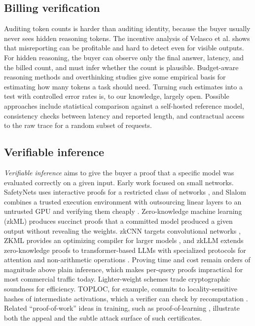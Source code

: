 \subsection{Billing verification}\label{billing-verification}

Auditing token counts is harder than auditing identity, because the buyer usually never sees hidden reasoning tokens. The incentive analysis of Velasco et al. \cite{velasco2025overcharging} shows that misreporting can be profitable and hard to detect even for visible outputs. For hidden reasoning, the buyer can observe only the final answer, latency, and the billed count, and must infer whether the count is plausible. Budget-aware reasoning methods \cite{han2024tokenbudget} and overthinking studies \cite{chen2024overthinking} give some empirical basis for estimating how many tokens a task should need. Turning such estimates into a test with controlled error rates is, to our knowledge, largely open. Possible approaches include statistical comparison against a self-hosted reference model, consistency checks between latency and reported length, and contractual access to the raw trace for a random subset of requests.

\subsection{Verifiable inference}\label{verifiable-inference}

\emph{Verifiable inference} aims to give the buyer a proof that a specific model was evaluated correctly on a given input. Early work focused on small networks. SafetyNets uses interactive proofs for a restricted class of networks \cite{ghodsi2017safetynets}, and Slalom combines a trusted execution environment with outsourcing linear layers to an untrusted GPU and verifying them cheaply \cite{tramer2019slalom}. Zero-knowledge machine learning (zkML) produces succinct proofs that a committed model produced a given output without revealing the weights. zkCNN targets convolutional networks \cite{liu2021zkcnn}, ZKML provides an optimizing compiler for larger models \cite{chen2024zkml}, and zkLLM extends zero-knowledge proofs to transformer-based LLMs with specialized protocols for attention and non-arithmetic operations \cite{sun2024zkllm}. Proving time and cost remain orders of magnitude above plain inference, which makes per-query proofs impractical for most commercial traffic today. Lighter-weight schemes trade cryptographic soundness for efficiency. TOPLOC, for example, commits to locality-sensitive hashes of intermediate activations, which a verifier can check by recomputation \cite{ong2025toploc}. Related ``proof-of-work'' ideas in training, such as proof-of-learning \cite{jia2021pol}, illustrate both the appeal and the subtle attack surface of such certificates.


